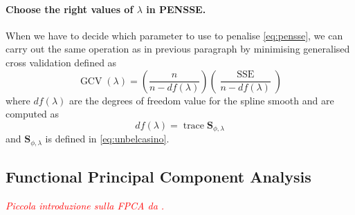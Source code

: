 \paragraph{Choose the right values of $\lambda$ in PENSSE.} When we have to decide which parameter to use to penalise \ref{eq:pensse}, we can carry out the same operation as in previous paragraph by minimising generalised cross validation defined as
\begin{equation}
\label{eq:gcv}
    \operatorname{GCV}(\lambda)=\left(\frac{n}{n-d f(\lambda)}\right)\left(\frac{\operatorname{SSE}}{n-d f(\lambda)}\right)
\end{equation}
where $df(\lambda)$ are the degrees of freedom value for the spline smooth and are computed as
\begin{equation}
   df(\lambda)=\operatorname{trace} \mathbf{S}_{\phi, \lambda}
\end{equation}
and $\mathbf{S}_{\phi, \lambda}$ is defined in \ref{eq:unbelcasino}.


\subsection{Functional Principal Component Analysis}
\textcolor{red}{\textit{Piccola introduzione sulla FPCA da \cite{ramsay_functional_2009}.}}



